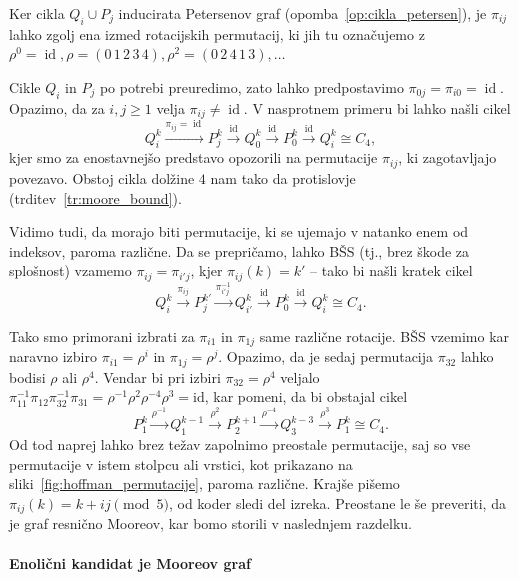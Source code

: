 \documentclass[fin1, tisk]{fmfdelo}
\newcommand{\id}{\operatorname{id}}
\begin{document}
\begin{dokaz}
Ker cikla $Q_i \cup P_j$ inducirata Petersenov graf (opomba~\ref{op:cikla_petersen}), 
je $\pi_{ij}$ lahko zgolj ena izmed rotacijskih permutacij, ki jih tu označujemo
z $\rho^0 = \id, \rho = (0\,1\,2\,3\,4), \rho^2 = (0\,2\,4\,1\,3), \ldots$

Cikle $Q_i$ in $P_j$ po potrebi preuredimo, zato
lahko predpostavimo $\pi_{0j} = \pi_{i0} = \id$.
Opazimo, da za $i, j \geq 1$ velja $\pi_{ij} \neq \id$.
V nasprotnem primeru bi lahko našli cikel 
$$Q_i^k \overset{\pi_{ij}=\id}{\rightarrow}P_j^k \overset{\id}{\rightarrow} Q_0^k \overset{\id}{\rightarrow} P_0^k \overset{\id}{\rightarrow}Q_i^k \cong C_4,$$ 
kjer smo za enostavnejšo predstavo opozorili na permutacije $\pi_{ij}$, ki zagotavljajo povezavo. Obstoj cikla dolžine $4$ nam tako da protislovje (trditev~\ref{tr:moore_bound}). 

Vidimo tudi, da morajo biti permutacije, ki se ujemajo v natanko enem od in\-dek\-sov,
paroma različne. Da se prepričamo, lahko BŠS (tj., brez škode za splošnost) vzamemo $\pi_{ij} = \pi_{i'j}$, kjer $\pi_{ij}(k) = k'$ -- tako bi
našli kratek cikel
$$Q_i^k \overset{\pi_{ij}}{\rightarrow} P_j^{k'} \overset{\pi_{i'j}^{-1}}{\rightarrow} Q_{i'}^{k} \overset{\id}{\rightarrow} P_0^k \overset{\id}{\rightarrow}Q_i^k \cong C_4.$$ 

Tako smo primorani izbrati za $\pi_{i1}$ in $\pi_{1j}$ same različne rotacije. BŠS 
vzemimo kar naravno izbiro $\pi_{i1} = \rho^i$ in $\pi_{1j} = \rho^j$. Opazimo, da je sedaj 
permutacija $\pi_{32}$ lahko bodisi $\rho$ ali $\rho^4$. Vendar bi pri izbiri $\pi_{32} = \rho^4$ 
veljalo $\pi_{11}^{-1} \pi_{12} \pi_{32}^{-1} \pi_{31} = \rho^{-1} \rho^2 \rho^{-4} \rho^3 = \text{id}$, 
kar pomeni, da bi obstajal cikel 
$$P_1^k \overset{\rho^{-1}}{\rightarrow} Q_1^{k-1} \overset{\rho^2}{\rightarrow} P_2^{k+1} \overset{\rho^{-4}}{\rightarrow} Q_3^{k-3} \overset{\rho^3}{\rightarrow} P_1^k \cong C_4.$$
Od tod
naprej lahko brez težav zapolnimo preostale permutacije, saj so vse permutacije v istem stolpcu ali vrstici, kot prikazano na sliki~\ref{fig:hoffman_permutacije},
paroma različne. Krajše pišemo $\pi_{ij}(k) = k + ij \pmod 5$, od koder sledi del izreka. Preostane le še preveriti,
da je graf resnično Mooreov, kar bomo storili v naslednjem razdelku.
\end{dokaz}

\paragraph{Enolični kandidat je Mooreov graf}
\end{document}
